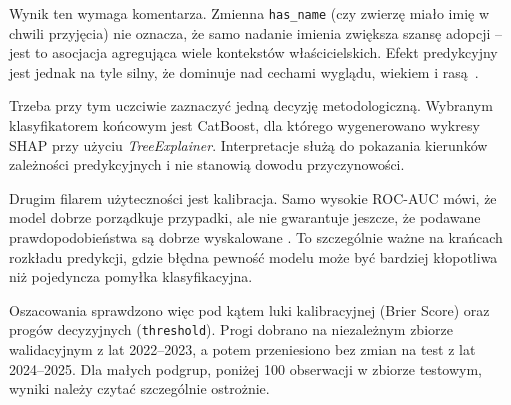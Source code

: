 

Wynik ten wymaga komentarza. Zmienna \texttt{has\_name} (czy zwierzę miało imię w chwili przyjęcia) nie oznacza, że samo nadanie imienia zwiększa szansę adopcji -- jest to asocjacja agregująca wiele kontekstów właścicielskich. Efekt predykcyjny jest jednak na tyle silny, że dominuje nad cechami wyglądu, wiekiem i rasą~\cite{Lundberg2020}.


Trzeba przy tym uczciwie zaznaczyć jedną decyzję metodologiczną. Wybranym klasyfikatorem końcowym jest CatBoost, dla którego wygenerowano wykresy SHAP przy użyciu \emph{TreeExplainer}. Interpretacje służą do pokazania kierunków zależności predykcyjnych i nie stanowią dowodu przyczynowości.

Drugim filarem użyteczności jest kalibracja. Samo wysokie ROC-AUC mówi, że model dobrze porządkuje przypadki, ale nie gwarantuje jeszcze, że podawane prawdopodobieństwa są dobrze wyskalowane \cite{Fawcett2006,Brier1950}. To szczególnie ważne na krańcach rozkładu predykcji, gdzie błędna pewność modelu może być bardziej kłopotliwa niż pojedyncza pomyłka klasyfikacyjna.


Oszacowania sprawdzono więc pod kątem luki kalibracyjnej (Brier Score) oraz progów decyzyjnych (\texttt{threshold}). Progi dobrano na niezależnym zbiorze walidacyjnym z lat 2022--2023, a potem przeniesiono bez zmian na test z lat 2024--2025. Dla małych podgrup, poniżej 100 obserwacji w zbiorze testowym, wyniki należy czytać szczególnie ostrożnie.

